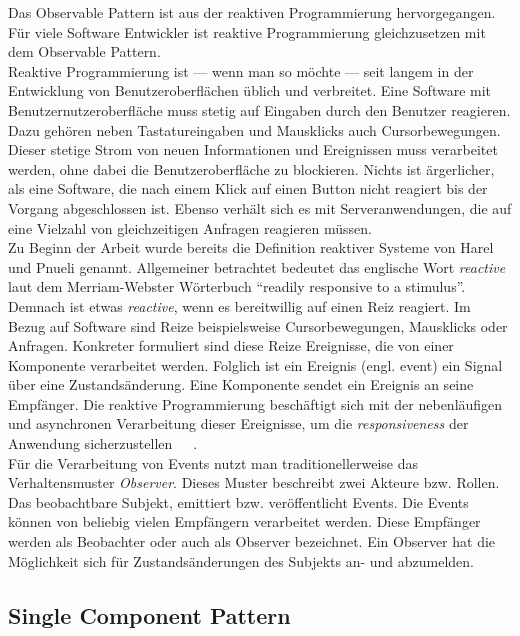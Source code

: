 Das Observable Pattern ist aus der reaktiven Programmierung hervorgegangen. Für viele Software Entwickler ist reaktive Programmierung gleichzusetzen mit dem Observable Pattern.\\
Reaktive Programmierung ist --- wenn man so möchte --- seit langem in der Entwicklung von Benutzeroberflächen üblich und verbreitet. Eine Software mit Benutzernutzeroberfläche muss stetig auf Eingaben durch den Benutzer reagieren. Dazu gehören neben Tastatureingaben und Mausklicks auch Cursorbewegungen. Dieser stetige Strom von neuen Informationen und Ereignissen muss verarbeitet werden, ohne dabei die Benutzeroberfläche zu blockieren. Nichts ist ärgerlicher, als eine Software, die nach einem Klick auf einen Button nicht reagiert bis der Vorgang abgeschlossen ist. Ebenso verhält sich es mit Serveranwendungen, die auf eine Vielzahl von gleichzeitigen Anfragen reagieren müssen.\\
Zu Beginn der Arbeit wurde bereits die Definition reaktiver Systeme von Harel und Pnueli genannt. Allgemeiner betrachtet bedeutet das englische Wort \textit{reactive} laut dem Merriam-Webster Wörterbuch \enquote{readily responsive to a stimulus}. Demnach ist etwas \textit{reactive}, wenn es bereitwillig auf einen Reiz reagiert. Im Bezug auf Software sind Reize beispielsweise Cursorbewegungen, Mausklicks oder Anfragen. Konkreter formuliert sind diese Reize Ereignisse, die von einer Komponente verarbeitet werden. Folglich ist ein Ereignis (engl. event) ein Signal über eine Zustandsänderung. Eine Komponente sendet ein Ereignis an seine Empfänger. Die reaktive Programmierung beschäftigt sich mit der nebenläufigen und asynchronen Verarbeitung dieser Ereignisse, um die \textit{responsiveness} der Anwendung sicherzustellen~\cite{rappl_introduction_2016}~\cite[S.~4]{carkci_dataflow_2014}~\cite[S.~5]{blackheath_functional_2015}.\\
Für die Verarbeitung von Events nutzt man traditionellerweise das Verhaltensmuster \textit{Observer}. Dieses Muster beschreibt zwei Akteure bzw. Rollen. Das beobachtbare Subjekt, emittiert bzw. veröffentlicht Events. Die Events können von beliebig vielen Empfängern verarbeitet werden. Diese Empfänger werden als Beobachter oder auch als Observer bezeichnet. Ein Observer hat die Möglichkeit sich für Zustandsänderungen des Subjekts an- und abzumelden.\\

\pagebreak

\subsection{Single Component Pattern}

